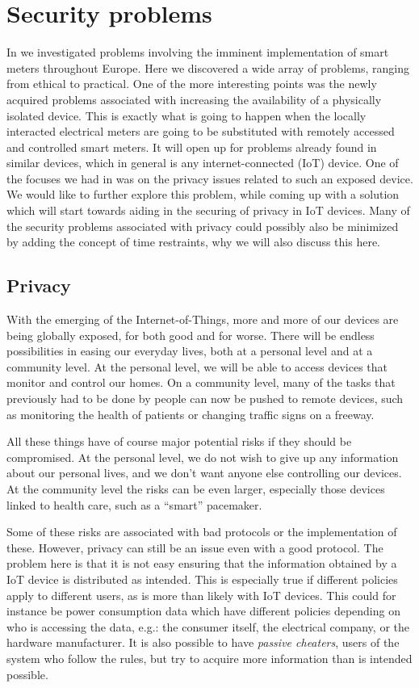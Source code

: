 
\section{Security problems}
In \cite{prespecialization} we investigated problems involving the imminent implementation of smart meters throughout Europe.
Here we discovered a wide array of problems, ranging from ethical to practical.
One of the more interesting points was the newly acquired problems associated with increasing the availability of a physically isolated device.
This is exactly what is going to happen when the locally interacted electrical meters are going to be substituted with remotely accessed and controlled smart meters.
It will open up for problems already found in similar devices, which in general is any internet-connected (IoT) device.
One of the focuses we had in \cite{prespecialization} was on the privacy issues related to such an exposed device.
We would like to further explore this problem, while coming up with a solution which will start towards aiding in the securing of privacy in IoT devices.
Many of the security problems associated with privacy could possibly also be minimized by adding the concept of time restraints, why we will also discuss this here.

\subsection{Privacy}
With the emerging of the Internet-of-Things, more and more of our devices are being globally exposed, for both good and for worse.
There will be endless possibilities in easing our everyday lives, both at a personal level and at a community level.
At the personal level, we will be able to access devices that monitor and control our homes.
On a community level, many of the tasks that previously had to be done by people can now be pushed to remote devices, such as monitoring the health of patients or changing traffic signs on a freeway.

All these things have of course major potential risks if they should be compromised.
At the personal level, we do not wish to give up any information about our personal lives, and we don't want anyone else controlling our devices.
At the community level the risks can be even larger, especially those devices linked to health care, such as a ``smart'' pacemaker.

Some of these risks are associated with bad protocols or the implementation of these.
However, privacy can still be an issue even with a good protocol.
The problem here is that it is not easy ensuring that the information obtained by a IoT device is distributed as intended.
This is especially true if different policies apply to different users, as is more than likely with IoT devices.
This could for instance be power consumption data which have different policies depending on who is accessing the data, e.g.: the consumer itself, the electrical company, or the hardware manufacturer.
It is also possible to have \emph{passive cheaters}, users of the system who follow the rules, but try to acquire more information than is intended possible.

